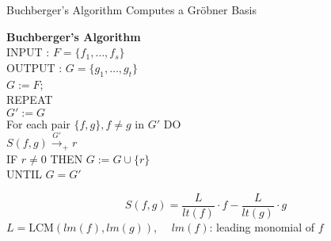 \documentclass[xcolor=dvipsnames]{beamer}
\begin{document}
\begin{frame}{\large{Buchberger's Algorithm Computes a Gr\"obner Basis}}

{\bf Buchberger's Algorithm}\\
 INPUT : $F = \{f_1, \dots, f_s\}$\\
 OUTPUT : $G = \{g_1,\dots ,g_t\}$\\ %
  $G:= F$; \\
  REPEAT\\
  \hspace{0.1in} $G' := G$\\
  \hspace{0.1in} For each pair $\{f, g\}, f \neq g$ in $G'$ DO\\
\hspace{0.2in}  $S(f, g) \stackrel{G'}{\textstyle\longrightarrow}_+
r$ \\
\hspace{0.2in}  IF $r \neq 0$ THEN $G:= G \cup \{r\}$ \\
UNTIL $G = G'$

\[
S(f,g)=\frac{L}{lt(f)}\cdot f - \frac{L}{lt(g)}\cdot g
\]
$L = \text{LCM}(lm(f), lm(g))$, ~~$lm(f)$: leading monomial of $f$

\end{frame}
\end{document}
